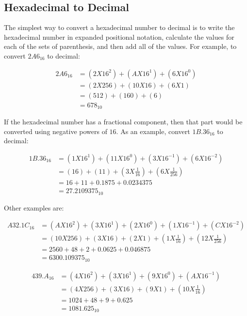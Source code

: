 \subsection{Hexadecimal to Decimal} 
\label{MF:sub:hexadecimal_to_decimal}
The simplest way to convert a hexadecimal number to decimal is to write the hexadecimal number in expanded positional notation, calculate the values for each of the sets of parenthesis, and then add all of the values. For example, to convert $ 2A6_{16} $ to decimal:

\begin{align}
  2A6_{16} &= (2X16^2)+(AX16^1)+(6X16^0) \\
  \nonumber
  &= (2X256)+(10X16)+(6X1) \\
  \nonumber
  &= (512)+(160)+(6) \\
  \nonumber
  &= 678_{10}
\end{align}


If the hexadecimal number has a fractional component, then that part would be converted using negative powers of $ 16 $. As an example, convert $ 1B.36_{16} $ to decimal:

\begin{align}
  1B.36_{16} &= (1X16^1)+(11X16^0)+(3X16^{-1})+(6X16^{-2}) \\
  \nonumber
  &= (16)+(11)+(3X\frac{1}{16})+(6X\frac{1}{256}) \\
  \nonumber
  &= 16+11+0.1875+0.0234375 \\
  \nonumber
  &= 27.2109375_{10}
\end{align}

Other examples are:

\begin{align}
  A32.1C_{16} &= (AX16^2)+(3X16^1)+(2X16^0)+(1X16^{-1})+(CX16^{-2}) \\
  \nonumber
  &= (10X256)+(3X16)+(2X1)+(1X\frac{1}{16})+(12X\frac{1}{256}) \\
  \nonumber
  &= 2560+48+2+0.0625+0.046875 \\
  \nonumber
  &= 6300.109375_{10}
\end{align}

\begin{align}
  439.A_{16} &= (4X16^2)+(3X16^1)+(9X16^0)+(AX16^{-1}) \\
  \nonumber
  &= (4X256)+(3X16)+(9X1)+(10X\frac{1}{16}) \\
  \nonumber
  &= 1024+48+9+0.625 \\
  \nonumber
  &= 1081.625_{10}
\end{align}

